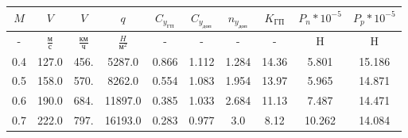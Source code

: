 \begin{tabular}{|c|c|c|c|c|c|c|c|c|c|}
\hline
$M$ & $V$ & $V$ & $q$ & $C_{y_{ГП}}$ & $C_{y_{доп}}$ & $n_{y_{доп}}$ & $K_{ГП}$ & $P_{n}*10^{-5}$ & $P_{p}*10^{-5}$ \\ 
\hline
- & $\frac{м}{с}$ & $\frac{км}{ч}$ & $\frac{H}{м^2}$ & - & - & - & - & H & H \\ 
\hline
0.4 & 127.0 & 456. & 5287.0 & 0.866 & 1.112 & 1.284 & 14.36 & 5.801 & 15.186 \\ 
\hline
0.5 & 158.0 & 570. & 8262.0 & 0.554 & 1.083 & 1.954 & 13.97 & 5.965 & 14.871 \\ 
\hline
0.6 & 190.0 & 684. & 11897.0 & 0.385 & 1.033 & 2.684 & 11.13 & 7.487 & 14.471 \\ 
\hline
0.7 & 222.0 & 797. & 16193.0 & 0.283 & 0.977 & 3.0 & 8.12 & 10.262 & 14.084 \\ 
\hline
\end{tabular}